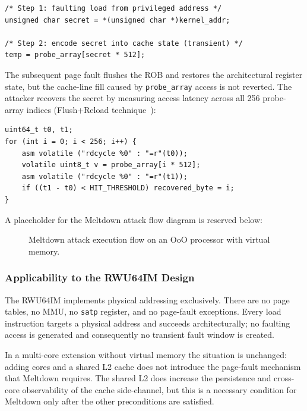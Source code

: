 \begin{verbatim}
/* Step 1: faulting load from privileged address */
unsigned char secret = *(unsigned char *)kernel_addr;

/* Step 2: encode secret into cache state (transient) */
temp = probe_array[secret * 512];
\end{verbatim}

The subsequent page fault flushes the ROB and restores the architectural
register state, but the cache-line fill caused by \texttt{probe\_array} access
is not reverted.  The attacker recovers the secret by measuring access latency
across all 256 probe-array indices (Flush+Reload
technique~\cite{lipp2018meltdown,gruss2016flushflush}):

\begin{verbatim}
uint64_t t0, t1;
for (int i = 0; i < 256; i++) {
    asm volatile ("rdcycle %0" : "=r"(t0));
    volatile uint8_t v = probe_array[i * 512];
    asm volatile ("rdcycle %0" : "=r"(t1));
    if ((t1 - t0) < HIT_THRESHOLD) recovered_byte = i;
}
\end{verbatim}

A placeholder for the Meltdown attack flow diagram is reserved below:

\begin{figure}[h]
\centering
{}
\caption{Meltdown attack execution flow on an OoO processor with virtual memory.}
\label{fig:meltdown_flow}
\end{figure}

\subsubsection{Applicability to the RWU64IM Design}

The RWU64IM implements physical addressing exclusively.  There are no page tables,
no MMU, no \texttt{satp} register, and no page-fault exceptions.  Every load
instruction targets a physical address and succeeds architecturally; no faulting
access is generated and consequently no transient fault window is created.

In a multi-core extension without virtual memory the situation is unchanged: adding
cores and a shared \mbox{L2} cache does not introduce the page-fault mechanism that
Meltdown requires.  The shared \mbox{L2} does increase the persistence and
cross-core observability of the cache side-channel, but this is a necessary condition
for Meltdown only after the other preconditions are satisfied.


